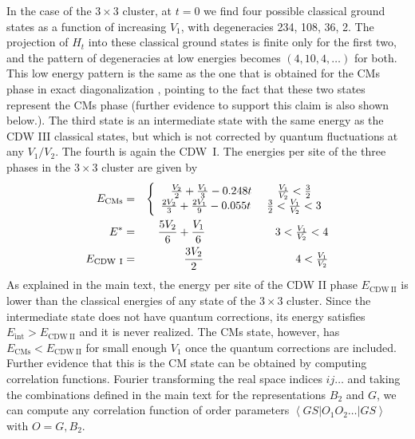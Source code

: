 \documentclass[aps,prx,10pt,twocolumn,floatfix,superscriptaddress,showpacs,numerical,footinbib]{revtex4-1}
\begin{document}
In the case of the $3\times3$ cluster, at $t=0$ we find four possible classical ground states as a function of increasing $V_1$, with degeneracies 234, 108, 36, 2.
%
The projection of $H_t$ into these classical ground states is finite only for the first two, and the pattern of degeneracies at low energies becomes $(4,10,4,\ldots)$ for both.
%
This low energy pattern is the same as the one that is obtained for the CMs phase in exact diagonalization \cite{GGNVC13}, 
pointing to the fact that these two states represent the CMs phase (further evidence to support this claim is also shown below.).  
%
The third state is an intermediate state with the same energy as the CDW III classical states, but which is not corrected by quantum fluctuations at any $V_1/V_2$.  
%
The fourth is again the CDW~I. 
%
The energies per site of the three phases in the $3\times3$ cluster are given by
%
\begin{eqnarray}
E_{\mathrm{CMs}} &=& \left\{ \begin{array}{c} \frac{V_2}{2} + \frac{V_1}{3} -0.248t \hspace{8mm} \tfrac{V_1}{V_2} < \tfrac{3}{2} \\  
\frac{2V_2}{3} + \frac{2V_1}{9} -0.055t \hspace{5mm}   \tfrac{3}{2} <\tfrac{V_1}{V_2} < 3\end{array} \right. \\
E^* &=& \frac{5V_2}{6} + \frac{V_1}{6} \hspace{22mm}   3 <\tfrac{V_1}{V_2} < 4 \\
E_{\mathrm{CDW~I}} &=& \frac{3V_2}{2}   \hspace{29mm}   4 < \tfrac{V_1}{V_2} 
\end{eqnarray}
%
As explained in the main text, the energy per site of the CDW II phase $E_{\mathrm{CDW~II}}$ is lower than the classical energies of any state of the $3\times3$ cluster. 
%
Since the intermediate state does not have quantum corrections, its energy satisfies $E_{\mathrm{int}}>E_{\mathrm{CDW~II}}$ and it is never realized. 
%
The CMs state, however, has $E_{\mathrm{CMs}} < E_{\mathrm{CDW~II}}$ for small enough $V_1$ once the quantum corrections are included. 
%
Further evidence that this is the CM state can be obtained by computing correlation functions. 
%
Fourier transforming the real space indices $ij\ldots$ and taking the combinations defined in the main text for the representations $B_2$ and $G$, we can compute any correlation function of order parameters $\left< GS \right| O_1 O_2 \ldots \left| GS \right> $ with $O = G, B_2$. 
\end{document}
